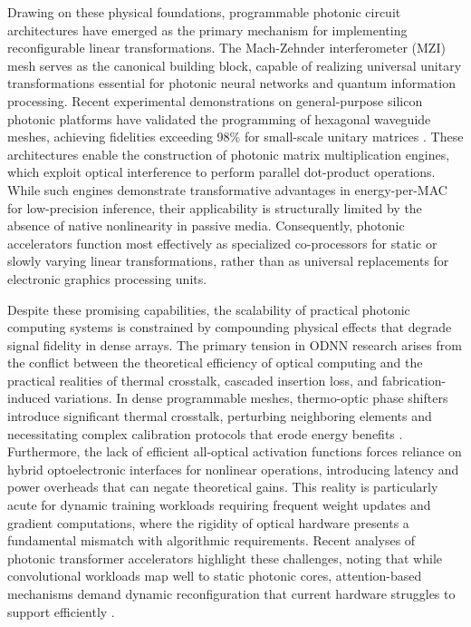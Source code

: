 Drawing on these physical foundations, programmable photonic circuit architectures have emerged as the primary mechanism for implementing reconfigurable linear transformations. The Mach-Zehnder interferometer (MZI) mesh serves as the canonical building block, capable of realizing universal unitary transformations essential for photonic neural networks and quantum information processing. Recent experimental demonstrations on general-purpose silicon photonic platforms have validated the programming of hexagonal waveguide meshes, achieving fidelities exceeding 98\% for small-scale unitary matrices \citep{doi_10_1063_5_0235712_fb28986d}. These architectures enable the construction of photonic matrix multiplication engines, which exploit optical interference to perform parallel dot-product operations. While such engines demonstrate transformative advantages in energy-per-MAC for low-precision inference, their applicability is structurally limited by the absence of native nonlinearity in passive media. Consequently, photonic accelerators function most effectively as specialized co-processors for static or slowly varying linear transformations, rather than as universal replacements for electronic graphics processing units.

Despite these promising capabilities, the scalability of practical photonic computing systems is constrained by compounding physical effects that degrade signal fidelity in dense arrays. The primary tension in ODNN research arises from the conflict between the theoretical efficiency of optical computing and the practical realities of thermal crosstalk, cascaded insertion loss, and fabrication-induced variations. In dense programmable meshes, thermo-optic phase shifters introduce significant thermal crosstalk, perturbing neighboring elements and necessitating complex calibration protocols that erode energy benefits \citep{doi_10_1109_access_2020_3013116_8fec1fb2}. Furthermore, the lack of efficient all-optical activation functions forces reliance on hybrid optoelectronic interfaces for nonlinear operations, introducing latency and power overheads that can negate theoretical gains. This reality is particularly acute for dynamic training workloads requiring frequent weight updates and gradient computations, where the rigidity of optical hardware presents a fundamental mismatch with algorithmic requirements. Recent analyses of photonic transformer accelerators highlight these challenges, noting that while convolutional workloads map well to static photonic cores, attention-based mechanisms demand dynamic reconfiguration that current hardware struggles to support efficiently \citep{doi_10_1109_hpca57654_2024_00059_f488ee7a}.

